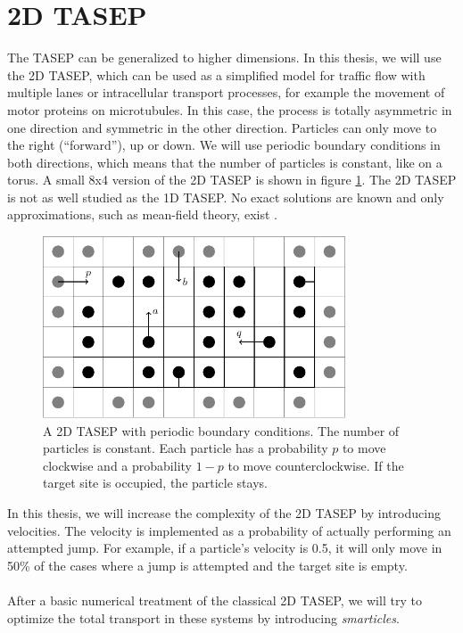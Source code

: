 \section{2D TASEP}
\label{sec:2d-tasep}
The TASEP can be generalized to higher dimensions. In this thesis, we will use the 2D TASEP, which can be used as a simplified model for traffic flow with multiple lanes or intracellular transport processes, for example the movement of motor proteins on microtubules. In this case, the process is totally asymmetric in one direction and symmetric in the other direction. Particles can only move to the right (\enquote{forward}), up or down. We will use periodic boundary conditions in both directions, which means that the number of particles is constant, like on a torus. A small 8x4 version of the 2D TASEP is shown in figure \ref{fig:tasep_2d}. The 2D TASEP is not as well studied as the 1D TASEP. No exact solutions are known and only approximations, such as mean-field theory, exist \cite{goykolov_asymmetric_2007}.
\\
\begin{figure}[h]
    \centering
    \includegraphics[width=0.8\textwidth]{tasep_2d.pdf}
    \caption{A 2D TASEP with periodic boundary conditions. The number of particles is constant. Each particle has a probability $p$ to move clockwise and a probability $1-p$ to move counterclockwise. If the target site is occupied, the particle stays.}
    \label{fig:tasep_2d}
\end{figure}
In this thesis, we will increase the complexity of the 2D TASEP by introducing velocities. The velocity is implemented as a probability of actually performing an attempted jump. For example, if a particle's velocity is 0.5, it will only move in 50\% of the cases where a jump is attempted and the target site is empty. 
\\
\\
After a basic numerical treatment of the classical 2D TASEP, we will try to optimize the total transport in these systems by introducing \textit{smarticles}. 


